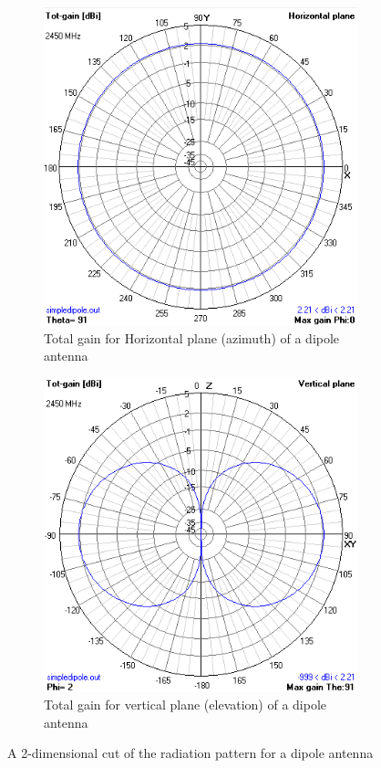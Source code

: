 \begin{figure}[h!]
  \centering
  \begin{subfigure}[b]{0.49\linewidth}
    \includegraphics[width=\linewidth]{figures/HorizontalRad.PNG}   \caption{Total gain for Horizontal plane (azimuth) of a dipole antenna }
  \end{subfigure}
  \begin{subfigure}[b]{0.49\linewidth}
    \includegraphics[width=\linewidth]{figures/VerticalRad.PNG}
    \caption{Total gain for vertical plane (elevation) of a dipole antenna}
  \end{subfigure}
  \caption{A 2-dimensional cut of the radiation pattern for a dipole antenna}
\end{figure}

